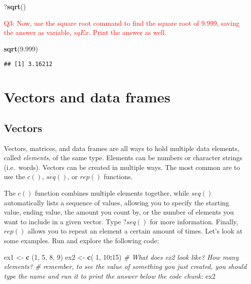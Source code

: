 \documentclass[]{article}
\newenvironment{Shaded}{\begin{snugshade}}{\end{snugshade}}
\newcommand{\CommentTok}[1]{\textcolor[rgb]{0.56,0.35,0.01}{\textit{#1}}}
\newcommand{\DecValTok}[1]{\textcolor[rgb]{0.00,0.00,0.81}{#1}}
\newcommand{\FloatTok}[1]{\textcolor[rgb]{0.00,0.00,0.81}{#1}}
\newcommand{\KeywordTok}[1]{\textcolor[rgb]{0.13,0.29,0.53}{\textbf{#1}}}
\newcommand{\NormalTok}[1]{#1}
\newcommand{\OperatorTok}[1]{\textcolor[rgb]{0.81,0.36,0.00}{\textbf{#1}}}
\newcommand{\StringTok}[1]{\textcolor[rgb]{0.31,0.60,0.02}{#1}}
\begin{document}
\begin{Shaded}
\begin{Highlighting}[]
\NormalTok{?}\KeywordTok{sqrt}\NormalTok{()}
\end{Highlighting}
\end{Shaded}

\textcolor{red}{Q3: Now, use the square root command to find the square root of 9.999, saving the answer as variable, $sqEx$. Print the answer as well.}

\begin{Shaded}
\begin{Highlighting}[]
\KeywordTok{sqrt}\NormalTok{(}\FloatTok{9.999}\NormalTok{)}
\end{Highlighting}
\end{Shaded}

\begin{verbatim}
## [1] 3.16212
\end{verbatim}

\hypertarget{vectors-and-data-frames}{%
\section{Vectors and data frames}\label{vectors-and-data-frames}}

\hypertarget{vectors}{%
\subsection{Vectors}\label{vectors}}

Vectors, matrices, and data frames are all ways to hold multiple data
elements, called \emph{elements}, of the same type. Elements can be
numbers or character strings (i.e.~words). Vectors can be created in
multiple ways. The most common are to use the \(c()\), \(seq()\), or
\(rep()\) functions.

The \(c()\) function combines multiple elements together, while
\(seq()\) automatically lists a sequence of values, allowing you to
specify the starting value, ending value, the amount you count by, or
the number of elements you want to include in a given vector. Type
\(?seq()\) for more information. Finally, \(rep()\) allows you to repeat
an element a certain amount of times. Let's look at some examples. Run
and explore the following code:

\begin{Shaded}
\begin{Highlighting}[]
\NormalTok{ex1 <-}\StringTok{ }\KeywordTok{c}\NormalTok{ (}\DecValTok{1}\NormalTok{, }\DecValTok{5}\NormalTok{, }\DecValTok{8}\NormalTok{, }\DecValTok{9}\NormalTok{)}
\NormalTok{ex2 <-}\StringTok{ }\KeywordTok{c}\NormalTok{( }\DecValTok{1}\NormalTok{, }\DecValTok{10}\OperatorTok{:}\DecValTok{15}\NormalTok{) }\CommentTok{# What does ex2 look like? How many elements?}
\CommentTok{# remember, to see the value of something you just created, you should type the name and run it to print the answer below the code chunk:}
\NormalTok{ex2}
\end{Highlighting}
\end{Shaded}
\end{document}
